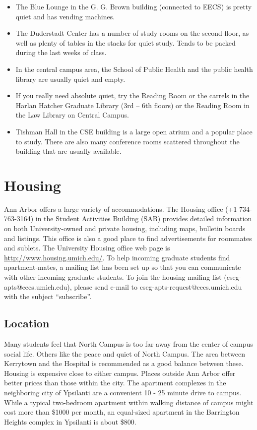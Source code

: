 \documentclass[11pt]{article}
\begin{document}
\begin{itemize}
\item The Blue Lounge in the G. G. Brown building (connected to EECS) is pretty quiet and has vending machines.
\item The Duderstadt Center has a number of study rooms on the second floor, as well as plenty of tables in the stacks for quiet study.  Tends to be packed during the last weeks of class.
\item In the central campus area, the School of Public Health and the public health library are usually quiet and empty.
\item If you really need absolute quiet, try the Reading Room or the carrels in the Harlan Hatcher Graduate Library (3rd – 6th floors) or the Reading Room in the Law Library on Central Campus.
\item Tishman Hall in the CSE building is a large open atrium and a
  popular place to study.  There are also many conference rooms
  scattered throughout the building that are usually available.
\end{itemize}
\section{Housing}
\label{sec-10}

Ann Arbor offers a large variety of accommodations.  The Housing office (+1 734-763-3164) in the Student Activities Building (SAB) provides detailed information on both University-owned and private housing, including maps, bulletin boards and listings.  This office is also a good place to find advertisements for roommates and sublets.  The University Housing office web page is \href{http://www.housing.umich.edu/}{http://www.housing.umich.edu/}.
To help incoming graduate students find apartment-mates, a mailing list has been set up so that you can communicate with other incoming graduate students.  To join the housing mailing list (cseg-apts@eecs.umich.edu), please send e-mail to cseg-apts-request@eecs.umich.edu with the subject “subscribe”.
\subsection{Location}
\label{sec-10_1}

Many students feel that North Campus is too far away from the center of campus social life.  Others like the peace and quiet of North Campus.  The area between Kerrytown and the Hospital is recommended as a good balance between these.  Housing is expensive close to either campus.
Places outside Ann Arbor offer better prices than those within the city.  The apartment complexes in the neighboring city of Ypsilanti are a convenient 10 - 25 minute drive to campus.  While a typical two-bedroom apartment within walking distance of campus might cost more than \$1000 per month, an equal-sized apartment in the Barrington Heights complex in Ypsilanti is about \$800.
\end{document}
